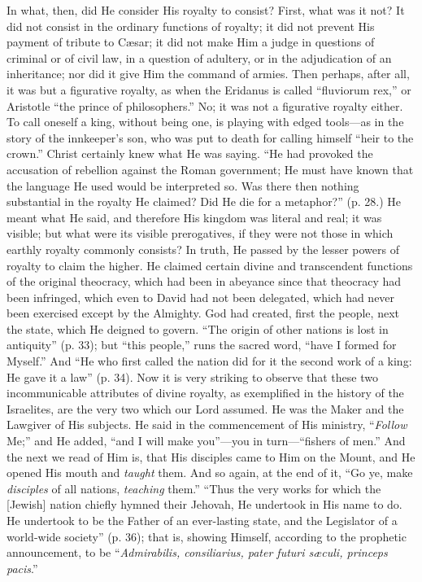 In what, then, did He consider His royalty to
consist? First, what was it not? It did not consist in the ordinary
functions of royalty; it did not prevent His payment of tribute to Cæsar;
it did not make Him a judge in questions of criminal or of civil law,
in a question of adultery, or in the adjudication of an inheritance;
nor did it give Him the command of armies. Then perhaps, after all, it
was but a figurative royalty, as when the Eridanus is called ``fluviorum
rex,'' or Aristotle ``the prince of philosophers.'' No; it was not a
figurative royalty either. To call oneself a king, without being one,
is playing with edged tools—as in the story of the innkeeper's son,
who was put to death for calling himself ``heir to the crown.'' Christ
certainly knew what He was saying. ``He had provoked the
accusation of rebellion against the Roman government; He must have
known that the language He used would be interpreted so. Was there
then nothing substantial in the royalty He claimed? Did He die for a
metaphor?'' (p. 28.) He meant what He said, and therefore His kingdom
was literal and real; it was visible; but what were its visible
prerogatives, if they were not those in which earthly royalty commonly
consists? In truth, He passed by the lesser powers of royalty to claim
the higher. He claimed certain divine and transcendent functions of
the original theocracy, which had been in abeyance since that
theocracy had been infringed, which even to David had not been
delegated, which had never been exercised except by the Almighty. God
had created, first the people, next the state, which He deigned to
govern. ``The origin of other nations is lost in antiquity'' (p. 33);
but ``this people,'' runs the sacred word, ``have I formed for Myself.''
And ``He who first called the nation did for it the second work of a
king: He gave it a law'' (p. 34). Now it is very striking to observe
that these two incommunicable attributes of divine royalty, as
exemplified in the history of the Israelites, are the very two which
our Lord assumed. He was the Maker and the Lawgiver of His subjects.
He said in the commencement of His ministry, ``\emph{Follow} Me;'' and
He added, ``and I will make you''—you in turn—``fishers of men.''
And the next we read of Him is, that His disciples came to Him on the
Mount, and He opened His mouth and \emph{taught} them. And so again,
at the end of it, ``Go ye, make \emph{disciples} of all nations, \emph{teaching}
them.'' ``Thus the very works for which the [Jewish] nation chiefly
hymned their Jehovah, He undertook in His name to do. He undertook to
be the Father of an ever-lasting state, and the Legislator of a
world-wide society'' (p. 36); that is, showing Himself, according to
the prophetic announcement, to be ``\emph{Admirabilis, consiliarius, pater
futuri sæculi, princeps pacis}.''

